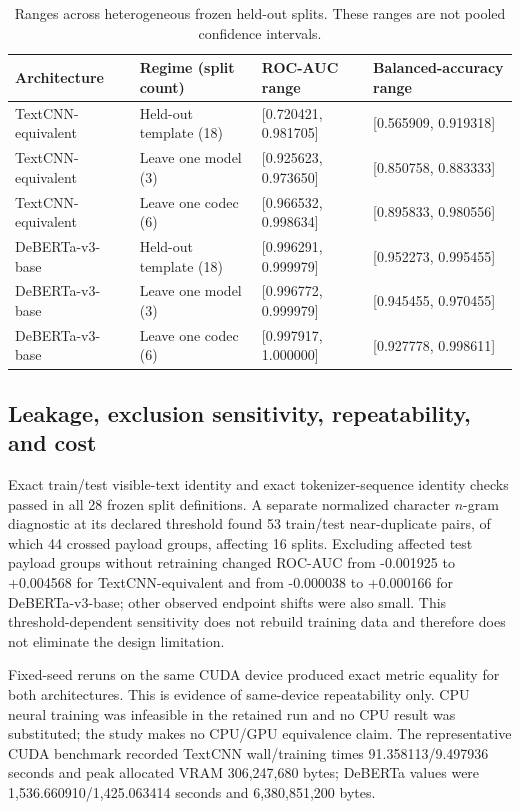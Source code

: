 \documentclass[fleqn,10pt]{wlscirep}
\begin{document}
\begin{table}[H]
\centering
\small
\begin{tabularx}{\textwidth}{L{0.22\textwidth}L{0.19\textwidth}L{0.22\textwidth}Y}
\toprule
Architecture & Regime (split count) & ROC-AUC range & Balanced-accuracy range \\
\midrule
TextCNN-equivalent & Held-out template (18) & [0.720421, 0.981705] & [0.565909, 0.919318] \\
TextCNN-equivalent & Leave one model (3) & [0.925623, 0.973650] & [0.850758, 0.883333] \\
TextCNN-equivalent & Leave one codec (6) & [0.966532, 0.998634] & [0.895833, 0.980556] \\
DeBERTa-v3-base & Held-out template (18) & [0.996291, 0.999979] & [0.952273, 0.995455] \\
DeBERTa-v3-base & Leave one model (3) & [0.996772, 0.999979] & [0.945455, 0.970455] \\
DeBERTa-v3-base & Leave one codec (6) & [0.997917, 1.000000] & [0.927778, 0.998611] \\
\bottomrule
\end{tabularx}
\caption{\label{tab:detector-ranges}Ranges across heterogeneous frozen held-out splits. These ranges are not pooled confidence intervals.}
\end{table}

\subsection*{Leakage, exclusion sensitivity, repeatability, and cost}

Exact train/test visible-text identity and exact tokenizer-sequence identity checks passed in all 28 frozen split definitions. A separate normalized character \(n\)-gram diagnostic at its declared threshold found 53 train/test near-duplicate pairs, of which 44 crossed payload groups, affecting 16 splits. Excluding affected test payload groups without retraining changed ROC-AUC from -0.001925 to +0.004568 for TextCNN-equivalent and from -0.000038 to +0.000166 for DeBERTa-v3-base; other observed endpoint shifts were also small. This threshold-dependent sensitivity does not rebuild training data and therefore does not eliminate the design limitation.

Fixed-seed reruns on the same CUDA device produced exact metric equality for both architectures. This is evidence of same-device repeatability only. CPU neural training was infeasible in the retained run and no CPU result was substituted; the study makes no CPU/GPU equivalence claim. The representative CUDA benchmark recorded TextCNN wall/training times 91.358113/9.497936 seconds and peak allocated VRAM 306,247,680 bytes; DeBERTa values were 1,536.660910/1,425.063414 seconds and 6,380,851,200 bytes.
\end{document}
